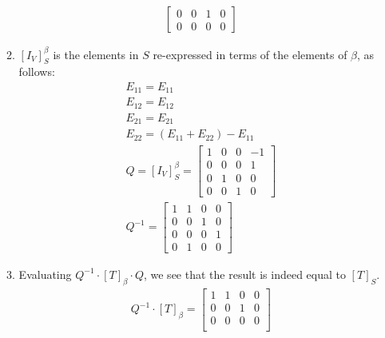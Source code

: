 \documentclass[12pt]{article}
\begin{document}
\begin{enumerate}
\begin{enumerate}
\begin{gather*}
\begin{bmatrix}
                                    0 & 0 & 1 & 0 \\
                                    0 & 0 & 0 & 0
                              \end{bmatrix}
                        \end{gather*}
                  \item $[I_V]^\beta_S$ is the elements in $S$ re-expressed in terms of the elements of $\beta$, as follows:
                        \begin{gather*}
                              E_{11}=E_{11} \\
                              E_{12}=E_{12} \\
                              E_{21}=E_{21} \\
                              E_{22}=(E_{11}+E_{22})-E_{11} \\
                              Q=[I_V]^\beta_S=\begin{bmatrix}
                                    1 & 0 & 0 & -1 \\
                                    0 & 0 & 0 & 1  \\
                                    0 & 1 & 0 & 0  \\
                                    0 & 0 & 1 & 0
                              \end{bmatrix} \\
                              Q^{-1}=\begin{bmatrix}
                                    1 & 1 & 0 & 0 \\
                                    0 & 0 & 1 & 0 \\
                                    0 & 0 & 0 & 1 \\
                                    0 & 1 & 0 & 0
                              \end{bmatrix}
                        \end{gather*}
                  \item Evaluating $Q^{-1} \cdot [T]_\beta \cdot Q$, we see that the result is indeed equal to $[T]_S$.
                        \begin{gather*}
                              Q^{-1} \cdot [T]_\beta = \begin{bmatrix}
                                    1 & 1 & 0 & 0 \\
                                    0 & 0 & 1 & 0 \\
                                    0 & 0 & 0 & 0 \\

\end{bmatrix}
\end{gather*}
\end{enumerate}
\end{enumerate}
\end{document}
